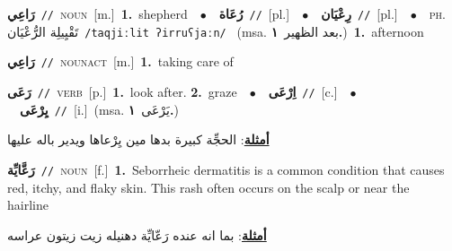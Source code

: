 \documentclass[10pt,a4paper,twoside]{article} %
\begin{document}
\begin{multicols}{2}
{\setlength\topsep{0pt}\textbf{\foreignlanguage{arabic}{رَاعِي}}\ {\color{gray}\texttt{//}\color{black}}\ \textsc{noun}\ [m.]\ \textbf{1.}~shepherd\ \ $\bullet$\ \ \setlength\topsep{0pt}\textbf{\foreignlanguage{arabic}{رُعَاة}}\ {\color{gray}\texttt{//}\color{black}}\ [pl.]\ \ $\bullet$\ \ \setlength\topsep{0pt}\textbf{\foreignlanguage{arabic}{رِعْيَان}}\ {\color{gray}\texttt{//}\color{black}}\ [pl.]\ \ $\bullet$\ \ \textsc{ph.} \color{gray} \foreignlanguage{arabic}{تَقْيِيلِة الرُّعْيَان}\color{black}\ {\color{gray}\texttt{/{\sffamily taqjiːlit ʔirruʕjaːn}/}\color{black}}\ \color{gray} (msa. \foreignlanguage{arabic}{بعد الظهير}~\foreignlanguage{arabic}{\textbf{١.}})\color{black}\ \textbf{1.}~afternoon\ } \vspace{2mm}

{\setlength\topsep{0pt}\textbf{\foreignlanguage{arabic}{رَاعِي}}\ {\color{gray}\texttt{//}\color{black}}\ \textsc{noun\textunderscore act}\ [m.]\ \textbf{1.}~taking care of\ } \vspace{2mm}

{\setlength\topsep{0pt}\textbf{\foreignlanguage{arabic}{رَعَى}}\ {\color{gray}\texttt{//}\color{black}}\ \textsc{verb}\ [p.]\ \textbf{1.}~look after.  \textbf{2.}~graze\ \ $\bullet$\ \ \setlength\topsep{0pt}\textbf{\foreignlanguage{arabic}{اِرْعَى}}\ {\color{gray}\texttt{//}\color{black}}\ [c.]\ \ $\bullet$\ \ \setlength\topsep{0pt}\textbf{\foreignlanguage{arabic}{يِرْعَى}}\ {\color{gray}\texttt{//}\color{black}}\ [i.]\ \color{gray}(msa. \foreignlanguage{arabic}{يَرْعَى}~\foreignlanguage{arabic}{\textbf{١.}})\color{black}\  \begin{flushright}\color{gray}\foreignlanguage{arabic}{\textbf{\underline{\foreignlanguage{arabic}{أمثلة}}}: الحجِّة كبيرة بدها مين يِرْعاها ويدير باله عليها}\end{flushright}\color{black}} \vspace{2mm}

{\setlength\topsep{0pt}\textbf{\foreignlanguage{arabic}{رَعَّايِّة}}\ {\color{gray}\texttt{//}\color{black}}\ \textsc{noun}\ [f.]\ \textbf{1.}~Seborrheic dermatitis is a common condition that causes red, itchy, and flaky skin. This rash often occurs on the scalp or near the hairline\  \begin{flushright}\color{gray}\foreignlanguage{arabic}{\textbf{\underline{\foreignlanguage{arabic}{أمثلة}}}: بما انه عنده رَعّايِّة دهنيله زيت زيتون عراسه}\end{flushright}\color{black}} \vspace{2mm}


\end{multicols}
\end{document}
